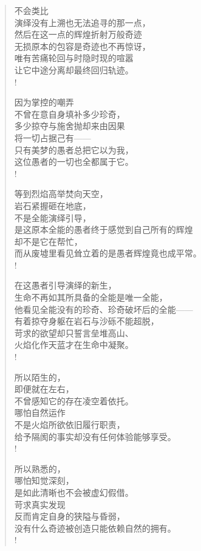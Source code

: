 \documentclass[UTF8, 12pt, a4paper]{ctexrep} %
\begin{document}
\begin{verse}

    不会类比\\
    演绎没有上溯也无法追寻的那一点，\\
    然后在这一点的辉煌折射万般奇迹\\
    无损原本的包容是奇迹也不再惊讶，\\
    唯有苦痛轮回与时隐时现的喧嚣\\
    让它中途分离却最终回归轨迹。\\!

    因为掌控的嘲弄\\
    不曾在意自身填补多少珍奇，\\
    多少掠夺与施舍抛却来由因果\\
    将一切占据己有——\\
    只有美梦的愚者总把它以为我，\\
    这位愚者的一切也全都属于它。\\!

    等到烈焰高举焚向天空，\\
    岩石紧握砸在地底，\\
    不是全能演绎引导，\\
    是这原本全能的愚者终于感觉到自己所有的辉煌\\
    却不是它在帮忙，\\
    而从废墟里看见耸立着的是愚者辉煌竟也成平常。\\!

    在这愚者引导演绎的新生，\\
    生命不再如其所具备的全能是唯一全能，\\
    他看见全能没有的珍奇、珍奇破坏后的全能——\\
    有着掠夺身躯在岩石与沙砾不能超脱，\\
    苛求的欲望却只誓言垒堆高山、\\
    火焰化作天蓝才在生命中凝聚。\\!

    所以陌生的，\\
    即便就在左右，\\
    不曾感知它的存在凌空着依托。\\
    哪怕自然运作\\
    不是火焰所欲依旧履行职责，\\
    给予隔阂的事实却没有任何体验能够享受。\\!

    所以熟悉的，\\
    哪怕知觉深刻，\\
    是如此清晰也不会被虚幻假借。\\
    苛求真实发现\\
    反而肯定自身的狭隘与昏弱，\\
    没有什么奇迹被创造只能依赖自然的拥有。\\!


\end{verse}
\end{document}
